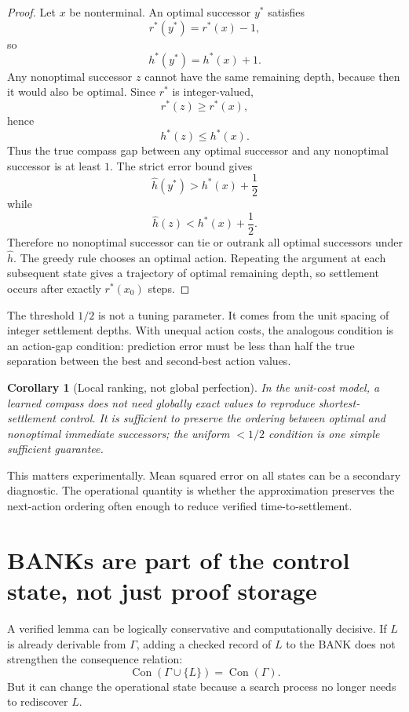 \documentclass[11pt]{article}
\newtheorem{corollary}[theorem]{Corollary}
\theoremstyle{definition}
\theoremstyle{remark}
\begin{document}
\begin{proof}
Let $x$ be nonterminal. An optimal successor $y^*$ satisfies
\[
r^*(y^*)=r^*(x)-1,
\]
so
\[
h^*(y^*)=h^*(x)+1.
\]
Any nonoptimal successor $z$ cannot have the same remaining depth, because then it would also be optimal. Since $r^*$ is integer-valued,
\[
r^*(z)\ge r^*(x),
\]
hence
\[
h^*(z)\le h^*(x).
\]
Thus the true compass gap between any optimal successor and any nonoptimal successor is at least $1$. The strict error bound gives
\[
\widehat h(y^*)>h^*(x)+\frac12
\]
while
\[
\widehat h(z)<h^*(x)+\frac12.
\]
Therefore no nonoptimal successor can tie or outrank all optimal successors under $\widehat h$. The greedy rule chooses an optimal action. Repeating the argument at each subsequent state gives a trajectory of optimal remaining depth, so settlement occurs after exactly $r^*(x_0)$ steps.
\end{proof}

The threshold $1/2$ is not a tuning parameter. It comes from the unit spacing of integer settlement depths. With unequal action costs, the analogous condition is an action-gap condition: prediction error must be less than half the true separation between the best and second-best action values.

\begin{corollary}[Local ranking, not global perfection]
In the unit-cost model, a learned compass does not need globally exact values to reproduce shortest-settlement control. It is sufficient to preserve the ordering between optimal and nonoptimal immediate successors; the uniform $<1/2$ condition is one simple sufficient guarantee.
\end{corollary}

This matters experimentally. Mean squared error on all states can be a secondary diagnostic. The operational quantity is whether the approximation preserves the next-action ordering often enough to reduce verified time-to-settlement.

\section{BANKs are part of the control state, not just proof storage}

A verified lemma can be logically conservative and computationally decisive. If $L$ is already derivable from $\Gamma$, adding a checked record of $L$ to the BANK does not strengthen the consequence relation:
\[
\operatorname{Con}(\Gamma\cup\{L\})=\operatorname{Con}(\Gamma).
\]
But it can change the operational state because a search process no longer needs to rediscover $L$.
\end{document}
